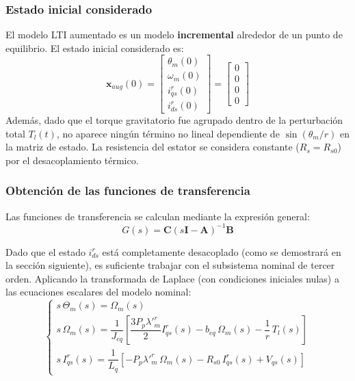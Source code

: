 \documentclass[12pt, a4paper,journal, onecolumn, compsoc]{IEEEtran}
\begin{document}
\subsubsection{Estado inicial considerado}
El modelo LTI aumentado es un modelo \textbf{incremental} alrededor de un punto de equilibrio. El estado inicial considerado es:
\begin{equation}
    \mathbf{x}_{aug}(0) = \begin{bmatrix} \theta_m(0) \\ \omega_m(0) \\ i_{qs}^r(0) \\ i_{ds}^r(0) \end{bmatrix} = \begin{bmatrix} 0 \\ 0 \\ 0 \\ 0 \end{bmatrix}
\end{equation}
Además, dado que el torque gravitatorio fue agrupado dentro de la perturbación total $T_l(t)$, no aparece ningún término no lineal dependiente de $\sin(\theta_m/r)$ en la matriz de estado. La resistencia del estator se considera constante ($R_s = R_{s0}$) por el desacoplamiento térmico.

\subsubsection{Obtención de las funciones de transferencia}
Las funciones de transferencia se calculan mediante la expresión general:
\begin{equation}
    G(s) = \mathbf{C}(s\mathbf{I} - \mathbf{A})^{-1}\mathbf{B}
\end{equation}

Dado que el estado $i_{ds}^r$ está completamente desacoplado (como se demostrará en la sección siguiente), es suficiente trabajar con el subsistema nominal de tercer orden. Aplicando la transformada de Laplace (con condiciones iniciales nulas) a las ecuaciones escalares del modelo nominal:
\begin{equation}
\begin{cases}
    s\,\Theta_m(s) = \Omega_m(s) \\[6pt]
    s\,\Omega_m(s) = \dfrac{1}{J_{eq}}\left[\dfrac{3 P_p \lambda'^r_m}{2} I_{qs}^r(s) - b_{eq}\,\Omega_m(s) - \dfrac{1}{r}\,T_l(s)\right] \\[6pt]
    s\,I_{qs}^r(s) = \dfrac{1}{L_q}\left[-P_p \lambda'^r_m\,\Omega_m(s) - R_{s0}\,I_{qs}^r(s) + V_{qs}(s)\right]
\end{cases}
\end{equation}
\end{document}
